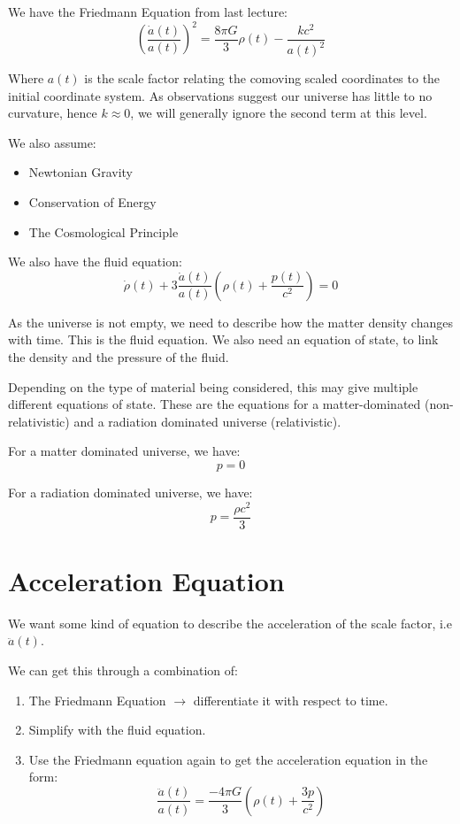 
We have the Friedmann Equation from last lecture:
\[
    \boxed{\left(\frac{\dot{a}(t)}{a(t)}\right)^2 =  \frac{8 \pi G}{3} \rho(t) - \frac{kc^2}{a(t)^2}}
\]

Where $a(t)$ is the scale factor relating the comoving scaled coordinates to the initial coordinate system. As observations suggest our universe has little to no curvature, hence $k \approx 0$, we will generally ignore the second term at this level.

We also assume:
\begin{itemize}
    \item Newtonian Gravity
    \item Conservation of Energy
    \item The Cosmological Principle
\end{itemize}


We also have the fluid equation:
\[
    \boxed{\dot{\rho}(t) + 3 \frac{\dot{a}(t)}{a(t)} \left(\rho(t) + \frac{p(t)}{c^2}\right) = 0}
\]

As the universe is not empty, we need to describe how the matter density changes with time. This is the fluid equation. We also need an equation of state, to link the density and the pressure of the fluid.

Depending on the type of material being considered, this may give multiple different equations of state. These are the equations for a matter-dominated (non-relativistic) and a radiation dominated universe (relativistic).

For a matter dominated universe, we have:
\[
    p = 0
\] 

For a radiation dominated universe, we have:
\[
    p = \frac{\rho c^2}{3}
\]

\section{Acceleration Equation}
We want some kind of equation to describe the acceleration of the scale factor, i.e $\ddot{a}(t)$.

We can get this through a combination of:
\begin{enumerate}
    \item The Friedmann Equation $\to$ differentiate it with respect to time.
    \item Simplify with the fluid equation.
    \item Use the Friedmann equation again to get the acceleration equation in the form:
    \[
        \frac{\ddot{a}(t)}{a(t)} = \frac{- 4 \pi G}{3} \left(\rho(t) + \frac{3p}{c^2}\right)
    \]
\end{enumerate}

